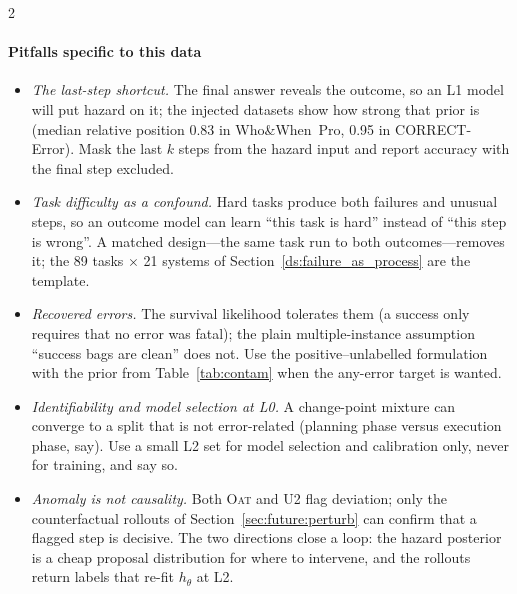 \begin{multicols}{2}
\paragraph{Pitfalls specific to this data}
\begin{itemize}[leftmargin=1.1em]
\item \emph{The last-step shortcut.} The final answer reveals the outcome, so an L1 model will put hazard on it; the injected datasets show how strong that prior is (median relative position 0.83 in Who\&When~Pro, 0.95 in CORRECT-Error). Mask the last $k$ steps from the hazard input and report accuracy with the final step excluded.
\item \emph{Task difficulty as a confound.} Hard tasks produce both failures and unusual steps, so an outcome model can learn ``this task is hard'' instead of ``this step is wrong''. A matched design---the same task run to both outcomes---removes it; the 89 tasks $\times$ 21 systems of Section~\ref{ds:failure_as_process} are the template.
\item \emph{Recovered errors.} The survival likelihood tolerates them (a success only requires that no error was fatal); the plain multiple-instance assumption ``success bags are clean'' does not. Use the positive--unlabelled formulation with the prior from Table~\ref{tab:contam} when the any-error target is wanted.
\item \emph{Identifiability and model selection at L0.} A change-point mixture can converge to a split that is not error-related (planning phase versus execution phase, say). Use a small L2 set for model selection and calibration only, never for training, and say so.
\item \emph{Anomaly is not causality.} Both \textsc{Oat} and U2 flag deviation; only the counterfactual rollouts of Section~\ref{sec:future:perturb} can confirm that a flagged step is decisive. The two directions close a loop: the hazard posterior is a cheap proposal distribution for where to intervene, and the rollouts return labels that re-fit $h_\theta$ at L2.
\end{itemize}


\end{multicols}
